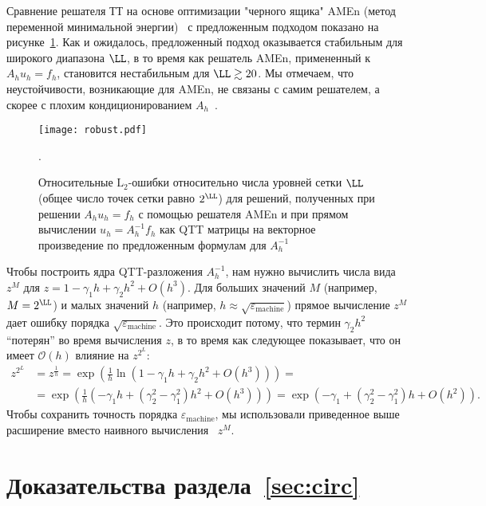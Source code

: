 Сравнение решателя ТТ на основе оптимизации "черного ящика" AMEn (метод переменной минимальной энергии)~\cite{ds-amen-2014} с предложенным подходом показано на рисунке~\ref{fig:numerical}.
Как и ожидалось, предложенный подход оказывается стабильным для широкого диапазона $\LL$, в то время как решатель AMEn, примененный к $A_h u_h = f_h$, становится нестабильным для $\LL\gtrsim 20$.
Мы отмечаем, что неустойчивости, возникающие для AMEn, не связаны с самим решателем, а скорее с плохим кондиционированием $A_h$~.

\begin{figure}
	\centering
	\texttt{[image: robust.pdf]}
	\caption{Относительные $\mathrm{L}_2$-ошибки относительно числа уровней сетки $\LL$ (общее число точек сетки равно $2^\LL$) для решений, полученных при решении $A_h u_h = f_h$ с помощью решателя AMEn и при прямом вычислении $u_h = A_h^{-1}f_h$ как QTT матрицы на векторное произведение по предложенным формулам для $A_h^{-1}$}.
	\label{fig:numerical}
\end{figure}

\begin{remark}
	Чтобы построить ядра QTT-разложения $A_h^{-1}$, нам нужно вычислить числа вида $z^M$ для $z = 1 - \gamma_1 h + \gamma_2 h^2 + O(h^3)$.
	Для больших значений $M$ (например, $M = 2^\LL$) и малых значений $h$ (например, $h \approx \sqrt{\varepsilon_{\mathrm{machine}}}$) прямое вычисление $z^M$ дает ошибку порядка $\sqrt{\varepsilon_{\mathrm{machine}}}$.
	Это происходит потому, что термин $\gamma_2h^2$ ``потерян'' во время вычисления $z$, в то время как следующее показывает, что он имеет $\mathcal{O}(h)$ влияние на $z^{2^L}$:
	\begin{align*}
	z^{2^L} &= z^{\frac{1}{h}} = \exp\left(\frac{1}{h}\ln(1 - \gamma_1 h + \gamma_2 h^2 + O(h^3))\right) = \\ &= \exp\left(\frac{1}{h}(-\gamma_1 h + (\gamma_2^2-\gamma_1^2)h^2 + O(h^3))\right)
	= \exp(-\gamma_1 + (\gamma_2^2 - \gamma_1^2)h + O(h^2)).
	\end{align*}
	Чтобы сохранить точность порядка $\varepsilon_{\mathrm{machine}}$, мы использовали приведенное выше расширение вместо наивного вычисления ~$z^M$.
\end{remark}


\section{Доказательства раздела~\ref{sec:circ}} \label{app:circ}

